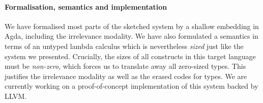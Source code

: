 

\paragraph{Formalisation, semantics and implementation}

We have formalised most parts of the sketched system by a shallow embedding in
Agda, including the irrelevance modality. We have also formulated a semantics in
terms of an untyped lambda calculus which is nevertheless \emph{sized} just like
the system we presented. Crucially, the sizes of all constructs in this target language
must be \emph{non-zero}, which forces us to translate away all zero-sized types. This
justifies the irrelevance modality as well as the erased codes for types. We are
currently working on a proof-of-concept implementation of this system backed by
LLVM.


